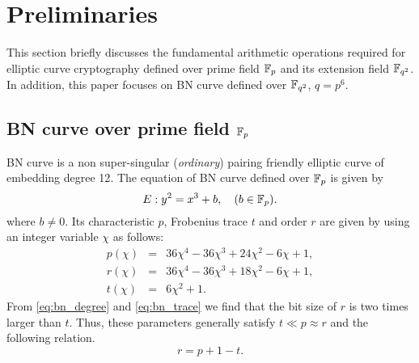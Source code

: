 \section{Preliminaries}
This section briefly discusses the fundamental arithmetic operations required for elliptic curve cryptography defined over prime field ${\mathbb{F}}_{p}$ and its extension field ${\mathbb{F}}_{q^{2}}$. In addition, this paper focuses on BN curve defined over ${\mathbb{F}}_{q^{2}}$, $q=p^6$.

\subsection{BN curve over prime field ${\mathbb{F}}_{p}$}
BN curve is a non\- super-singular (\textit{ordinary}) pairing friendly 
elliptic curve of embedding degree 12\cite{BN_def}. The equation of BN curve defined over ${\mathbb{F}}_{p}$ is given by 
\begin{equation}\label{eq:(BN_curve)}
E:y^2=x^3+b, \quad \mbox{($b \in {\mathbb{F}}_{p}$)}.
\end{equation}
where $b \neq 0$. Its characteristic $p$, Frobenius trace $t$ and order $r$ are given by using an integer variable $\chi$ as follows:
\begin{eqnarray}
p(\chi) & = & 36\chi^4-36\chi^3+24\chi^2-6\chi+1, \\
r(\chi) & = & 36\chi^4-36\chi^3+18\chi^2-6\chi+1,\label{eq:bn_degree}  \\
t(\chi) & = & 6\chi^2+1.\label{eq:bn_trace} 
\end{eqnarray} 
From \eqref{eq:bn_degree} and \eqref{eq:bn_trace} we find that the bit size of $r$ is two times larger than $t$. Thus, these parameters generally satisfy $t \ll p \approx r$ and the following relation.
\begin{equation}\label{eq:rpt_relation}
r = p+1-t.
\end{equation}

